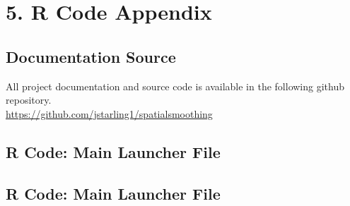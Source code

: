 \documentclass[11pt]{article}
\newcommand{\myindent}{\hspace*{1cm}}
\begin{document}
\newpage
\section{5. R Code Appendix}

\subsection{Documentation Source}
All project documentation and source code is available in the following github repository. \\

\myindent \underline{https://github.com/jstarling1/spatialsmoothing}

\subsection{R Code: Main Launcher File}


\subsection{R Code: Main Launcher File}


% 
% 
% 
% 
% 
\end{document}
